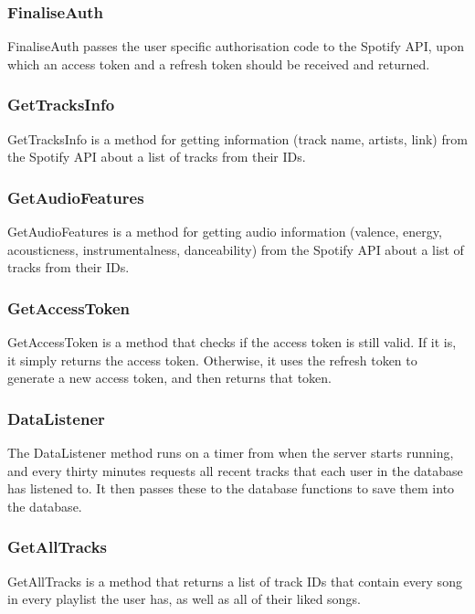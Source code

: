 \documentclass[11pt]{report}
\begin{document}
\hrulefill

\subsubsection{FinaliseAuth}
FinaliseAuth passes the user specific authorisation code to the Spotify API, upon which an access token and a refresh token should be received and returned.

\subsubsection{GetTracksInfo}
GetTracksInfo is a method for getting information (track name, artists, link) from the Spotify API about a list of tracks from their IDs.

\subsubsection{GetAudioFeatures}
GetAudioFeatures is a method for getting audio information (valence, energy, acousticness, instrumentalness, danceability) from the Spotify API about a list of tracks from their IDs.

\subsubsection{GetAccessToken}
GetAccessToken is a method that checks if the access token is still valid. If it is, it simply returns the access token. Otherwise, it uses the refresh token to generate a new access token, and then returns that token.

\subsubsection{DataListener}
The DataListener method runs on a timer from when the server starts running, and every thirty minutes requests all recent tracks that each user in the database has listened to. It then passes these to the database functions to save them into the database.

\subsubsection{GetAllTracks}
GetAllTracks is a method that returns a list of track IDs that contain every song in every playlist the user has, as well as all of their liked songs.

\leavevmode \\
\end{document}
